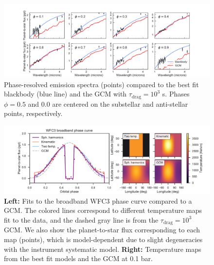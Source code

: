 \documentclass[twocolumn]{aastex61}
\begin{document}
\begin{figure}
\includegraphics[width = 1.0\textwidth]{Figures/emission_spectra.pdf}
\caption{Phase-resolved emission spectra (points) compared to the best fit blackbody (blue line) and the GCM with $\tau_\mathrm{drag} = 10^3$ s. Phases $\phi = 0.5$ and $0.0$ are centered on the substellar and anti-stellar points, respectively.}
\label{fig:spectra}
\end{figure}

\begin{figure}
\includegraphics[width = 1.0\textwidth]{Figures/hst_model_comparison.pdf}
\caption{\textbf{Left:} Fits to the broadband WFC3 phase curve compared to a GCM. The colored lines correspond to different temperature maps fit to the data, and the dashed gray line is from the $\tau_\mathrm{drag} = 10^3$ GCM. We also show the planet-to-star flux corresponding to each map (points), which is model-dependent due to slight degeneracies with the instrument systematic model.  \textbf{Right:} Temperature maps from the best fit models and the GCM at 0.1 bar.}
\label{fig:model_comparison}
\end{figure}
\end{document}
